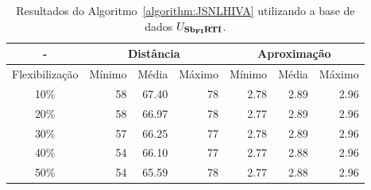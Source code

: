 \begin{table}[!htb]
  \caption{Resultados do Algoritmo~\ref{algorithm:JSNLHIVA} utilizando a base de dados $U_{\textbf{Sb\textsubscript{FI}RTI}}{}$.}
  \label{table:OTZHWXVI}
  \centering
  \begin{tabular}{|c|r|r|r|r|r|r|}
    \hline
      -            & \multicolumn{3}{c|}{Distância}             & \multicolumn{3}{c|}{Aproximação}           \\ \hline
    Flexibilização & Mínimo       & Média        & Máximo       & Mínimo       & Média        & Máximo       \\ \hline  
    10\%           & 58           & 67.40        & 78           & 2.78         & 2.89         & 2.96         \\ \hline
    20\%           & 58           & 66.97        & 78           & 2.77         & 2.89         & 2.96         \\ \hline
    30\%           & 57           & 66.25        & 77           & 2.78         & 2.89         & 2.96         \\ \hline
    40\%           & 54           & 66.10        & 77           & 2.77         & 2.88         & 2.96         \\ \hline
    50\%           & 54           & 65.59        & 78           & 2.77         & 2.88         & 2.96         \\ \hline    
  \end{tabular}
\end{table}